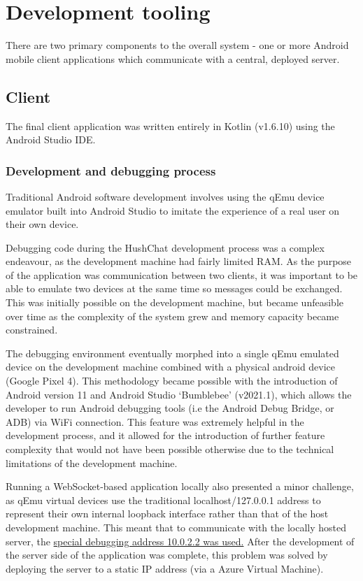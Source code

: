\documentclass{mproj}
\begin{document}
\section{Development tooling}
There are two primary components to the overall system - one or more Android mobile client applications which communicate with a central, deployed server.


\subsection{Client}
The final client application was written entirely in Kotlin (v1.6.10) using the Android Studio IDE. 

\subsubsection{Development and debugging process}
Traditional Android software development involves using the qEmu device emulator built into Android Studio to imitate the experience of a real user on their own device. 

Debugging code during the HushChat development process was a complex endeavour, as the development machine had fairly limited RAM. As the purpose of the application was communication between two clients, it was important to be able to emulate two devices at the same time so messages could be exchanged. This was initially possible on the development machine, but became unfeasible over time as the complexity of the system grew and memory capacity became constrained. 

The debugging environment eventually morphed into a single qEmu emulated device on the development machine combined with a physical android device (Google Pixel 4). This methodology became possible with the introduction of Android version 11 and Android Studio `Bumblebee' (v2021.1), which allows the developer to run Android debugging tools (i.e the Android Debug Bridge, or ADB) via WiFi connection. This feature was extremely helpful in the development process, and it allowed for the introduction of further feature complexity that would not have been possible otherwise due to the technical limitations of the development machine. 

Running a WebSocket-based application locally also presented a minor challenge, as qEmu virtual devices use the traditional localhost/127.0.0.1 address to represent their own internal loopback interface rather than that of the host development machine. This meant that to communicate with the locally hosted server, the \href{https://developer.android.com/studio/run/emulator-networking.html}{special debugging address 10.0.2.2 was used.} After the development of the server side of the application was complete, this problem was solved by deploying the server to a static IP address (via a Azure Virtual Machine).
\end{document}
